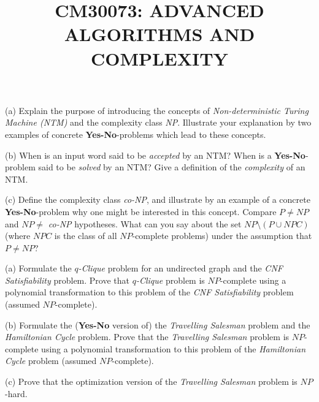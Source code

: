 \documentclass{exam}
\title{CM30073: ADVANCED ALGORITHMS AND COMPLEXITY}
\date{}
\begin{document}
\maketitle

\begin{question}
\begin{roster}
\item[(a)]
Explain the purpose of introducing the concepts of {\em Non-deterministic Turing Machine (NTM)}
and the complexity class {\em NP}.
Illustrate your explanation by two examples of concrete {\bf Yes-No}-problems which lead to
these concepts.

\item[(b)]
When is an input word said to be {\em accepted} by an NTM?
When is a {\bf Yes-No}-problem said to be {\em solved} by an NTM?
Give a definition of the {\em complexity} of an NTM.

\item[(c)]
Define the complexity class {\em co-NP}, and illustrate by an example of a concrete {\bf Yes-No}-problem
why one might be interested in this concept.
Compare $P \neq NP$ and $NP \neq$ {\em co-NP} hypotheses.
What can you say about the set $NP \setminus (P \cup NPC)$ (where $NPC$ is the class of all $NP$-complete
problems) under the assumption that $P \neq NP$?
\end{roster}
\end{question}

\begin{question}
\begin{roster}
\item[(a)]
Formulate the {\em $q$-Clique} problem for an undirected graph and the {\em CNF Satisfiability} problem.
Prove that {\em $q$-Clique} problem is $NP$-complete using a polynomial transformation to this problem of the
{\em CNF Satisfiability} problem (assumed $NP$-complete).

\item[(b)]
Formulate the ({\bf Yes-No} version of) the {\em Travelling Salesman} problem and the
{\em Hamiltonian Cycle} problem.
Prove that the {\em Travelling Salesman} problem is $NP$-complete using a polynomial transformation to
this problem of the {\em Hamiltonian Cycle} problem (assumed $NP$-complete).

\item[(c)]
Prove that the optimization version of the {\em Travelling Salesman} problem is $NP$-hard.
\end{roster}
\end{question}
\end{document}
